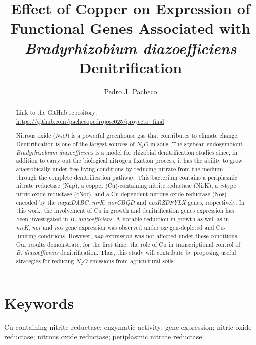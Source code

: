 \documentclass[a4paper,11pt]{article}
\title{\textbf{Effect of Copper on Expression of Functional Genes Associated with {\em Bradyrhizobium
diazoefficiens} Denitrification}}
\author{Pedro J. Pacheco}
\date{}
\begin{document}
\maketitle
\begin{abstract}

Link to the GitHub repository: 
\url{https://github.com/pachecopedrojose025/proyecto_final}

Nitrous oxide ($N_2O$) is a powerful greenhouse gas that contributes to climate change.
Denitrification is one of the largest sources of $N_2O$ in soils. The soybean endosymbiont {\em Bradyrhizobium
diazoefficiens} is a model for rhizobial denitrification studies since, in addition to carry out the biological nitrogen fixation process, it has
the ability to grow anaerobically under free-living conditions by reducing nitrate from the medium
through the complete denitrification pathway. This bacterium contains a periplasmic nitrate reductase
(Nap), a copper (Cu)-containing nitrite reductase (NirK), a {\em c}-type nitric oxide reductase (cNor), and
a Cu-dependent nitrous oxide reductase (Nos) encoded by the {\em napEDABC}, {\em nirK}, {\em norCBQD} and
{\em nosRZDFYLX} genes, respectively. In this work, the involvement of Cu in growth and denitrification genes expression has been investigated in {\em B. diazoefficiens}. A notable reduction in growth as well as in {\em nirK}, {\em nor} and {\em nos} gene expression  was observed
under oxygen-depleted and Cu-limiting conditions. However, {\em nap} expression was not affected under these conditions. Our results demonstrate,
for the first time, the role of Cu in transcriptional control of {\em B. diazoefficiens}
denitrification. Thus, this study will contribute by proposing useful strategies for reducing $N_2O$
emissions from agricultural soils.
\end{abstract}

\section*{Keywords}
Cu-containing nitrite reductase; enzymatic activity; gene expression; nitric oxide
reductase; nitrous oxide reductase; periplasmic nitrate reductase
\end{document}
